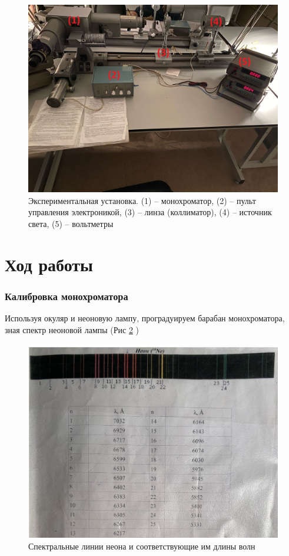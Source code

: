 \documentclass[a4paper,12pt]{article}
\begin{document}
\begin{figure}[h!]
	\centering
	\includegraphics[width = \linewidth]{setup}
	\caption{Экспериментальная установка. (1) -- монохроматор, (2) -- пульт управления электроникой, (3) -- линза (коллиматор), (4) -- источник света, (5) -- вольтметры}
	\label{fig1:setup}
\end{figure}

\section*{Ход работы}

\subsubsection*{Калибровка монохроматора}

Используя окуляр и неоновую лампу, проградуируем барабан монохроматора, зная спектр неоновой лампы (Рис \ref{fig2:spectre} )

\pagebreak

\begin{figure}[h!]
	\centering
	\includegraphics[width = 0.8\linewidth]{spectre}
	\caption{Спектральные линии неона и соответствующие им длины волн}
	\label{fig2:spectre}
\end{figure}
\end{document}
